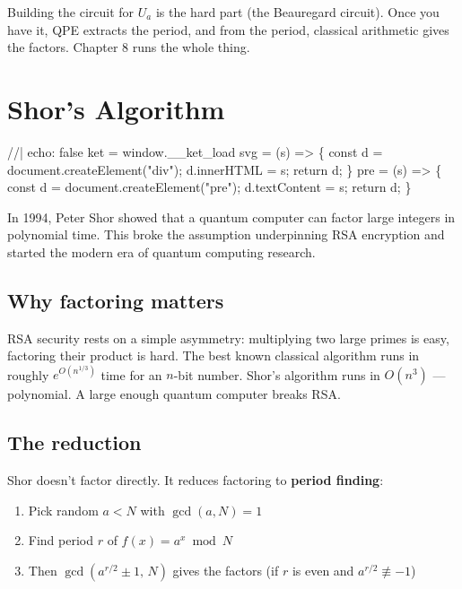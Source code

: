 \documentclass[
  11pt,
  letterpaper,
  oneside]{scrbook}
\newenvironment{Shaded}{\begin{snugshade}}{\end{snugshade}}
\newcommand{\NormalTok}[1]{\textcolor[rgb]{0.00,0.23,0.31}{#1}}
\providecommand{\tightlist}{%
  \setlength{\itemsep}{0pt}\setlength{\parskip}{0pt}}
\begin{document}
Building the circuit for \(U_a\) is the hard part (the Beauregard
circuit). Once you have it, QPE extracts the period, and from the
period, classical arithmetic gives the factors. Chapter 8 runs the whole
thing.

\chapter{Shor's Algorithm}\label{sec-shor}

\begin{Shaded}
\begin{Highlighting}[]
\NormalTok{//| echo: false}
\NormalTok{ket = window.\_\_ket\_load}
\NormalTok{svg = (s) =\textgreater{} \{ const d = document.createElement("div"); d.innerHTML = s; return d; \}}
\NormalTok{pre = (s) =\textgreater{} \{ const d = document.createElement("pre"); d.textContent = s; return d; \}}
\end{Highlighting}
\end{Shaded}

In 1994, Peter Shor showed that a quantum computer can factor large
integers in polynomial time. This broke the assumption underpinning RSA
encryption and started the modern era of quantum computing research.

\section{Why factoring matters}\label{why-factoring-matters}

RSA security rests on a simple asymmetry: multiplying two large primes
is easy, factoring their product is hard. The best known classical
algorithm runs in roughly \(e^{O(n^{1/3})}\) time for an \(n\)-bit
number. Shor's algorithm runs in \(O(n^3)\) --- polynomial. A large
enough quantum computer breaks RSA.

\section{The reduction}\label{the-reduction}

Shor doesn't factor directly. It reduces factoring to \textbf{period
finding}:

\begin{enumerate}
\def\labelenumi{\arabic{enumi}.}
\tightlist
\item
  Pick random \(a < N\) with \(\gcd(a, N) = 1\)
\item
  Find period \(r\) of \(f(x) = a^x \bmod N\)
\item
  Then \(\gcd(a^{r/2} \pm 1,\, N)\) gives the factors (if \(r\) is even
  and \(a^{r/2} \not\equiv -1\))
\end{enumerate}
\end{document}
